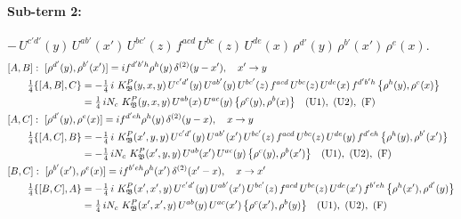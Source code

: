 \documentclass[10pt]{article}
\numberwithin{equation}{section}
\begin{document}
\paragraph{Sub-term 2:} $-\,U^{c'd'}(y)\,U^{ab'}(x')\,U^{bc'}(z)\,f^{acd}\,U^{bc}(z)\,U^{de}(x)\,\rho^{d'}(y)\,\rho^{b'}(x')\,\rho^{e}(x)$.
\begin{align}
&[A,B]:\ [\rho^{d'}(y),\rho^{b'}(x')]=i f^{d'b'h}\rho^{h}(y)\,\delta^{(2)}(y-x'),\quad x'\to y\notag\\
&\qquad \tfrac14\{[A,B],C\}=-\tfrac14\,i\,\,K^{P}_{\mathfrak B}(y,x,y)\,U^{c'd'}(y)\,U^{ab'}(y)\,U^{bc'}(z)\,f^{acd}\,U^{bc}(z)\,U^{de}(x)\,f^{d'b'h}\,\big\{\rho^{h}(y),\rho^{e}(x)\big\}\notag\\
&\qquad\phantom{\tfrac14\{[A,B],C\}}=\tfrac14\,i N_{c}\,\,K^{P}_{\mathfrak B}(y,x,y)\,U^{ab}(x)\,U^{ac}(y)\,\big\{\rho^{c}(y),\rho^{b}(x)\big\}\quad\text{(U1)},\ \text{(U2)},\ \text{(F)}
\label{eq:GIII.II.P-2-AB}\\
&[A,C]:\ [\rho^{d'}(y),\rho^{e}(x)]=i f^{d'eh}\rho^{h}(y)\,\delta^{(2)}(y-x),\quad x\to y\notag\\
&\qquad \tfrac14\{[A,C],B\}=-\tfrac14\,i\,\,K^{P}_{\mathfrak B}(x',y,y)\,U^{c'd'}(y)\,U^{ab'}(x')\,U^{bc'}(z)\,f^{acd}\,U^{bc}(z)\,U^{de}(y)\,f^{d'eh}\,\big\{\rho^{h}(y),\rho^{b'}(x')\big\}\notag\\
&\qquad\phantom{\tfrac14\{[A,C],B\}}=-\tfrac14\,i N_{c}\,\,K^{P}_{\mathfrak B}(x',y,y)\,U^{ab}(x')\,U^{ac}(y)\,\big\{\rho^{c}(y),\rho^{b}(x')\big\}\quad\text{(U1)},\ \text{(U2)},\ \text{(F)}
\label{eq:GIII.II.P-2-AC}\\
&[B,C]:\ [\rho^{b'}(x'),\rho^{e}(x)]=i f^{b'eh}\rho^{h}(x')\,\delta^{(2)}(x'-x),\quad x\to x'\notag\\
&\qquad \tfrac14\{[B,C],A\}=-\tfrac14\,i\,\,K^{P}_{\mathfrak B}(x',x',y)\,U^{c'd'}(y)\,U^{ab'}(x')\,U^{bc'}(z)\,f^{acd}\,U^{bc}(z)\,U^{de}(x')\,f^{b'eh}\,\big\{\rho^{h}(x'),\rho^{d'}(y)\big\}\notag\\
&\qquad\phantom{\tfrac14\{[B,C],A\}}=\tfrac14\,i N_{c}\,\,K^{P}_{\mathfrak B}(x',x',y)\,U^{ab}(y)\,U^{ac}(x')\,\big\{\rho^{c}(x'),\rho^{b}(y)\big\}\quad\text{(U1)},\ \text{(U2)},\ \text{(F)}
\label{eq:GIII.II.P-2-BC}
\end{align}
\end{document}
